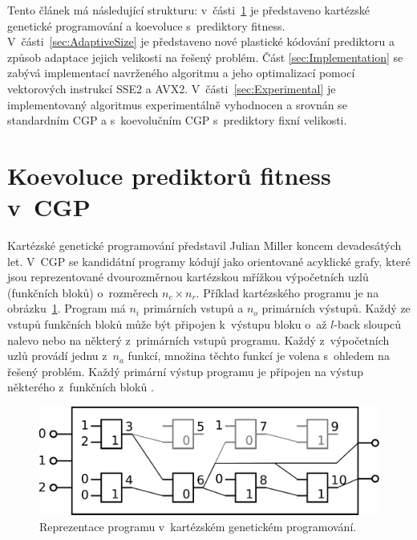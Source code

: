 \documentclass[czech]{ExcelAtFIT} %
\begin{document}
Tento článek má následující strukturu: v~části~\ref{sec:Coevolution} je představeno kartézské genetické programování a koevoluce s~prediktory fitness. V~části~\ref{sec:AdaptiveSize} je představeno nové plastické kódování prediktoru a způsob adaptace jejich velikosti na řešený problém. Část \ref{sec:Implementation} se zabývá implementací navrženého algoritmu a jeho optimalizací pomocí vektorových instrukcí SSE2 a AVX2. V~části~\ref{sec:Experimental} je implementovaný algoritmus experimentálně vyhodnocen a srovnán se standardním CGP a s~koevolučním CGP s~prediktory fixní velikosti.



\section{Koevoluce prediktorů fitness v~CGP}
\label{sec:Coevolution}

Kartézské genetické programování představil Julian Miller koncem devadesátých let. V~CGP se kandidátní programy kódují jako orientované acyklické grafy, které jsou reprezentované dvourozměrnou kartézskou mřížkou výpočetních uzlů (funkčních bloků) o~roz\-mě\-rech $n_c \times n_r$. Příklad kar\-téz\-ského programu je na obrázku~\ref{fig:CgpCircuit}. Program má $n_i$ primárních vstupů a $n_o$ primárních výstupů. Každý ze vstupů funkčních bloků může být připojen k~výstupu bloku o~až $l$-back sloupců nalevo nebo na některý z~primárních vstupů programu. Každý z~výpočetních uzlů provádí jednu z~$n_a$ funkcí, množina těchto funkcí je volena s~ohledem na řešený problém. Každý primární výstup programu je připojen na výstup některého z~funkčních bloků \cite{ZelenaCGP}.

\begin{figure}[h]
    \centering
    \includegraphics[width=0.8\linewidth]{images/cgp.pdf}
    \caption{Reprezentace programu v~kartézském genetickém programování.}
    \label{fig:CgpCircuit}
\end{figure}
\end{document}
